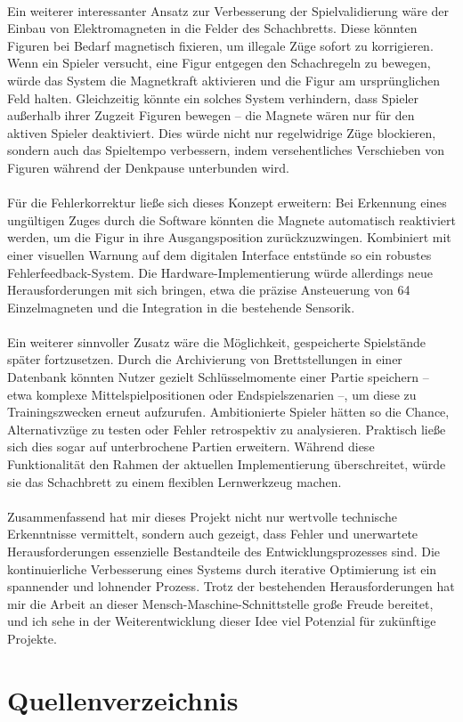 \documentclass[a4paper]{article}
\begin{document}
\\
Ein weiterer interessanter Ansatz zur Verbesserung der Spielvalidierung wäre der Einbau von Elektromagneten in die Felder des Schachbretts. Diese könnten Figuren bei Bedarf magnetisch fixieren, um illegale Züge sofort zu korrigieren. Wenn ein Spieler versucht, eine Figur entgegen den Schachregeln zu bewegen, würde das System die Magnetkraft aktivieren und die Figur am ursprünglichen Feld halten. Gleichzeitig könnte ein solches System verhindern, dass Spieler außerhalb ihrer Zugzeit Figuren bewegen – die Magnete wären nur für den aktiven Spieler deaktiviert. Dies würde nicht nur regelwidrige Züge blockieren, sondern auch das Spieltempo verbessern, indem versehentliches Verschieben von Figuren während der Denkpause unterbunden wird.\\
\\
Für die Fehlerkorrektur ließe sich dieses Konzept erweitern: Bei Erkennung eines ungültigen Zuges durch die Software könnten die Magnete automatisch reaktiviert werden, um die Figur in ihre Ausgangsposition zurückzuzwingen. Kombiniert mit einer visuellen Warnung auf dem digitalen Interface entstünde so ein robustes Fehlerfeedback-System. Die Hardware-Implementierung würde allerdings neue Herausforderungen mit sich bringen, etwa die präzise Ansteuerung von 64 Einzelmagneten und die Integration in die bestehende Sensorik.\\
\\
Ein weiterer sinnvoller Zusatz wäre die Möglichkeit, gespeicherte Spielstände später fortzusetzen. Durch die Archivierung von Brettstellungen in einer Datenbank könnten Nutzer gezielt Schlüsselmomente einer Partie speichern – etwa komplexe Mittelspielpositionen oder Endspielszenarien –, um diese zu Trainingszwecken erneut aufzurufen. Ambitionierte Spieler hätten so die Chance, Alternativzüge zu testen oder Fehler retrospektiv zu analysieren. Praktisch ließe sich dies sogar auf unterbrochene Partien erweitern. Während diese Funktionalität den Rahmen der aktuellen Implementierung überschreitet, würde sie das Schachbrett zu einem flexiblen Lernwerkzeug machen. \\
\\
Zusammenfassend hat mir dieses Projekt nicht nur wertvolle technische Erkenntnisse vermittelt, sondern auch gezeigt, dass Fehler und unerwartete Herausforderungen essenzielle Bestandteile des Entwicklungsprozesses sind. Die kontinuierliche Verbesserung eines Systems durch iterative Optimierung ist ein spannender und lohnender Prozess. Trotz der bestehenden Herausforderungen hat mir die Arbeit an dieser Mensch-Maschine-Schnittstelle große Freude bereitet, und ich sehe in der Weiterentwicklung dieser Idee viel Potenzial für zukünftige Projekte.  

\newpage
	\section{Quellenverzeichnis}
	\printbibliography[title = Quellen]
	\newpage
	\listoffigures 
\end{document}
